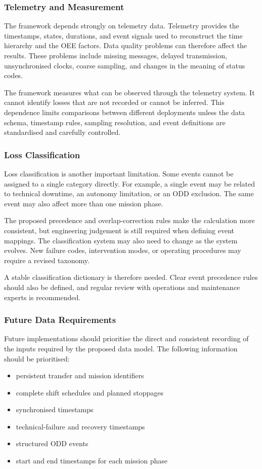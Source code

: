 \subsubsection{Telemetry and Measurement}
The framework depends strongly on telemetry data. Telemetry provides the timestamps, states, durations, and event signals used to reconstruct the time hierarchy and the OEE factors. Data quality problems can therefore affect the results. These problems include missing messages, delayed transmission, unsynchronised clocks, coarse sampling, and changes in the meaning of status codes.

The framework measures what can be observed through the telemetry system. It cannot identify losses that are not recorded or cannot be inferred. This dependence limits comparisons between different deployments unless the data schema, timestamp rules, sampling resolution, and event definitions are standardised and carefully controlled.

\subsubsection{Loss Classification}
Loss classification is another important limitation. Some events cannot be assigned to a single category directly. For example, a single event may be related to technical downtime, an autonomy limitation, or an ODD exclusion. The same event may also affect more than one mission phase.

The proposed precedence and overlap-correction rules make the calculation more consistent, but engineering judgement is still required when defining event mappings. The classification system may also need to change as the system evolves. New failure codes, intervention modes, or operating procedures may require a revised taxonomy.

A stable classification dictionary is therefore needed. Clear event precedence rules should also be defined, and regular review with operations and maintenance experts is recommended.

\subsubsection{Future Data Requirements}
Future implementations should prioritise the direct and consistent recording of the inputs required by the proposed data model. The following information should be prioritised:

\begin{itemize}
    \item persistent transfer and mission identifiers
    \item complete shift schedules and planned stoppages
    \item synchronised timestamps
    \item technical-failure and recovery timestamps
    \item structured ODD events
    \item start and end timestamps for each mission phase
\end{itemize}

